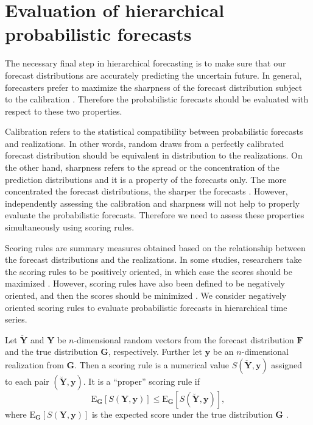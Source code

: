 \documentclass[a4paper, 11pt]{article}
\def\E{\text{E}}
\theoremstyle{theo}
\theoremstyle{definition}
\begin{document}
\section{Evaluation of hierarchical probabilistic forecasts}\label{sec:evaluation}

The necessary final step in hierarchical forecasting is to make sure that our forecast distributions are accurately predicting the uncertain future. In general, forecasters prefer to maximize the sharpness of the forecast distribution subject to the calibration \citep{Gneiting2014}. Therefore the probabilistic forecasts should be evaluated with respect to these two properties.

Calibration refers to the statistical compatibility between probabilistic forecasts and realizations. In other words, random draws from a perfectly calibrated forecast distribution should be equivalent in distribution to the realizations. On the other hand, sharpness refers to the spread or the concentration of the prediction distributions and it is a property of the forecasts only. The more concentrated the forecast distributions, the sharper the forecasts \citep{Gneiting2008}. However, independently assessing the calibration and sharpness will not help to properly evaluate the probabilistic forecasts. Therefore we need to assess these properties simultaneously using scoring rules.

Scoring rules are summary measures obtained based on the relationship between the forecast distributions and the realizations. In some studies, researchers take the scoring rules to be positively oriented, in which case the scores should be maximized \citep{Gneiting2007}. However, scoring rules have also been defined to be negatively oriented, and then the scores should be minimized \citep{Gneiting2014}. We consider negatively oriented scoring rules to evaluate probabilistic forecasts in hierarchical time series.

Let $\breve{\bm{Y}}$ and $\bm{Y}$ be $n$-dimensional random vectors from the forecast distribution $\bm{F}$ and the true distribution $\bm{G}$, respectively. Further let $\bm{y}$ be an $n$-dimensional realization from $\bm{G}$. Then a scoring rule is a numerical value $S(\breve{\bm{Y}},\bm{y})$ assigned to each pair $(\breve{\bm{Y}},\bm{y})$. It is a ``proper'' scoring rule if 
\begin{equation}\label{eq:(3.1.)}
\E_{\bm{G}}[S(\bm{Y},\bm{y})] \le \E_{\bm{G}}[S(\breve{\bm{Y}},\bm{y})],
\end{equation}
where $\E_{\bm{G}}[S(\bm{Y,y})]$ is the expected score under the true distribution $\bm{G}$ \citep{Gneiting2008, Gneiting2014}.
\end{document}
